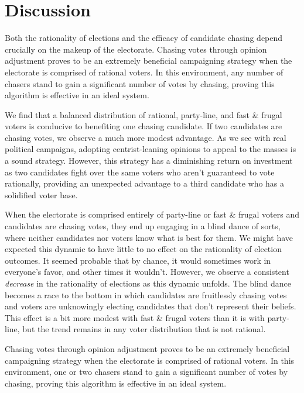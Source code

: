 \section{Discussion}
\label{sec:discussion}

Both the rationality of elections and the efficacy of candidate chasing depend
crucially on the makeup of the electorate. 
Chasing votes through opinion adjustment proves to be an extremely beneficial
campaigning strategy when the electorate is comprised of rational voters. In
this environment, any number of chasers stand to gain a significant number of
votes by chasing, proving this algorithm is effective in an ideal system.

We find that a balanced distribution of rational, party-line, and fast \&
frugal voters is conducive to benefiting one chasing candidate. If two
candidates are chasing votes, we observe a much more modest advantage. As we
see with real political campaigns, adopting centrist-leaning opinions to appeal
to the masses is a sound strategy. However, this strategy has a diminishing
return on investment as two candidates fight over the same voters who aren't
guaranteed to vote rationally, providing an unexpected advantage to a third
candidate who has a solidified voter base.

When the electorate is comprised entirely of party-line or fast \& frugal
voters and candidates are chasing votes, they end up engaging in a blind dance
of sorts, where neither candidates nor voters know what is best for them. We
might have expected this dynamic to have little to no effect on the rationality
of election outcomes. It seemed probable that by chance, it would sometimes
work in everyone's favor, and other times it wouldn't. However, we observe a
consistent \textit{decrease} in the rationality of elections as this dynamic
unfolds. The blind dance becomes a race to the bottom in which candidates are
fruitlessly chasing votes and voters are unknowingly electing candidates that
don't represent their beliefs. This effect is a bit more modest with fast \&
frugal voters than it is with party-line, but the trend remains in any voter
distribution that is not rational.

Chasing votes through opinion adjustment proves to be an extremely beneficial
campaigning strategy when the electorate is comprised of rational voters. In
this environment, one or two chasers stand to gain a significant number of
votes by chasing, proving this algorithm is effective in an ideal system.

